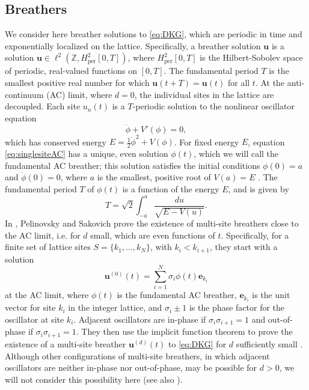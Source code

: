 \documentclass[12pt,reqno]{amsart}
\def\Z{{\mathbb Z}}
\def\per{\textrm{per}}
\newcommand{\evec}{\mathbf{e}}
\newcommand{\uvec}{\mathbf{u}}
\begin{document}
\subsection{Breathers}

We consider here breather solutions to \cref{eq:DKG}, which are periodic in time and exponentially localized on the lattice. Specifically, a breather solution $\uvec$ is a solution $\uvec \in \ell^2(\Z, H^2_\per[0,T])$, where $H^2_\per[0,T]$ is the Hilbert-Sobolev space of periodic, real-valued functions on $[0,T]$. 
The fundamental period $T$ is the smallest positive real number for which $\uvec(t+T) = \uvec(t)$ for all $t$. At the anti-continuum (AC) limit, where $d = 0$, the individual sites in the lattice are decoupled. Each site $u_n(t)$ is a $T$-periodic solution to the nonlinear oscillator equation
\begin{equation}\label{eq:singlesiteAC}
\ddot{\phi} + V'(\phi) = 0,
\end{equation}
which has conserved energy $E = \frac{1}{2}\dot{\phi}^2 + V(\phi)$. For fixed energy $E$, equation \cref{eq:singlesiteAC} has a unique, even solution $\phi(t)$, which we will call the fundamental AC breather; this solution satisfies the initial conditions $\phi(0) = a$ and $\dot{\phi}(0) = 0$, where $a$ is the smallest, positive root of $V(a) = E$ \cite{Pelinovsky2012}. The fundamental period $T$ of $\phi(t)$ is a function of the energy $E$, and is given by
\begin{equation}
T = \sqrt{2}\int_{-a}^a \frac{du}{\sqrt{E - V(u)}}.
\end{equation}
In \cite{Pelinovsky2012}, Pelinovsky and Sakovich prove the existence of multi-site breathers close to the AC limit, i.e. for $d$ small, which are even functions of $t$. Specifically, for a finite set of lattice sites $S = \{ k_1, \dots, k_N \}$, with $k_i < k_{i+1}$, they start with a solution
\begin{equation}
\uvec^{(0)}(t) = \sum_{i=1}^N \sigma_i \phi(t) \evec_{k_i}
\end{equation}
at the AC limit, where $\phi(t)$ is the fundamental AC breather, $\evec_{k_i}$ is the unit vector for site $k_i$ in the integer lattice, and $\sigma_i \pm 1$ is the phase factor for the oscillator at site $k_i$. Adjacent oscillators are in-phase if $\sigma_i \sigma_{i+1} = 1$ and out-of-phase if $\sigma_i \sigma_{i+1} = 1$. They then use the implicit function theorem to prove the existence of a multi-site breather $\uvec^{(d)}(t)$ to \cref{eq:DKG} for $d$ sufficiently small \cite[Theorem 1]{Pelinovsky2012}. Although other configurations of multi-site breathers, in which adjacent oscillators are neither in-phase nor out-of-phase, may be possible for $d > 0$, we will not consider this possibility here (see also \cite[Remark 2]{Pelinovsky2012}).
\end{document}
